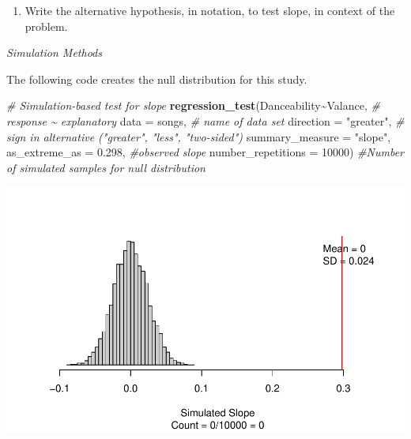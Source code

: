\documentclass[
]{report}
\newenvironment{Shaded}{\begin{snugshade}}{\end{snugshade}}
\newcommand{\AttributeTok}[1]{\textcolor[rgb]{0.13,0.29,0.53}{#1}}
\newcommand{\CommentTok}[1]{\textcolor[rgb]{0.56,0.35,0.01}{\textit{#1}}}
\newcommand{\DecValTok}[1]{\textcolor[rgb]{0.00,0.00,0.81}{#1}}
\newcommand{\FloatTok}[1]{\textcolor[rgb]{0.00,0.00,0.81}{#1}}
\newcommand{\FunctionTok}[1]{\textcolor[rgb]{0.13,0.29,0.53}{\textbf{#1}}}
\newcommand{\NormalTok}[1]{#1}
\newcommand{\SpecialCharTok}[1]{\textcolor[rgb]{0.81,0.36,0.00}{\textbf{#1}}}
\newcommand{\StringTok}[1]{\textcolor[rgb]{0.31,0.60,0.02}{#1}}
\providecommand{\tightlist}{%
  \setlength{\itemsep}{0pt}\setlength{\parskip}{0pt}}
\begin{document}
\vspace{1in}

\begin{enumerate}
\def\labelenumi{\arabic{enumi}.}
\setcounter{enumi}{5}
\tightlist
\item
  Write the alternative hypothesis, in notation, to test slope, in context of the problem.
\end{enumerate}

\vspace{0.5in}

\emph{Simulation Methods}

The following code creates the null distribution for this study.

\begin{Shaded}
\begin{Highlighting}[]
\CommentTok{\# Simulation{-}based test for slope}
\FunctionTok{regression\_test}\NormalTok{(Danceability}\SpecialCharTok{\textasciitilde{}}\NormalTok{Valance, }\CommentTok{\# response \textasciitilde{} explanatory}
               \AttributeTok{data =}\NormalTok{ songs, }\CommentTok{\# name of data set}
               \AttributeTok{direction =} \StringTok{"greater"}\NormalTok{, }\CommentTok{\# sign in alternative ("greater", "less", "two{-}sided")}
               \AttributeTok{summary\_measure =} \StringTok{"slope"}\NormalTok{, }
               \AttributeTok{as\_extreme\_as =} \FloatTok{0.298}\NormalTok{, }\CommentTok{\#observed slope}
               \AttributeTok{number\_repetitions =} \DecValTok{10000}\NormalTok{) }\CommentTok{\#Number of simulated samples for null distribution}
\end{Highlighting}
\end{Shaded}

\begin{center}\includegraphics[width=0.7\linewidth]{14-UR-module13_review_files/figure-latex/unnamed-chunk-3-1} \end{center}
\end{document}
